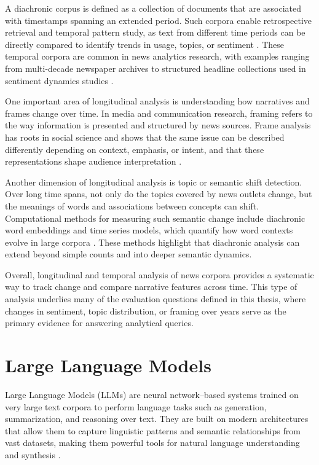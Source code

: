 A diachronic corpus is defined as a collection of documents that are associated with timestamps spanning an extended period. Such corpora enable retrospective retrieval and temporal pattern study, as text from different time periods can be directly compared to identify trends in usage, topics, or sentiment \cite{ir_temporal_ir}. These temporal corpora are common in news analytics research, with examples ranging from multi-decade newspaper archives to structured headline collections used in sentiment dynamics studies \cite{10.1371/journal.pone.0276367}.

One important area of longitudinal analysis is understanding how narratives and frames change over time. In media and communication research, framing refers to the way information is presented and structured by news sources. Frame analysis has roots in social science and shows that the same issue can be described differently depending on context, emphasis, or intent, and that these representations shape audience interpretation \cite{frame_analysis_wikipedia}.

Another dimension of longitudinal analysis is topic or semantic shift detection. Over long time spans, not only do the topics covered by news outlets change, but the meanings of words and associations between concepts can shift. Computational methods for measuring such semantic change include diachronic word embeddings and time series models, which quantify how word contexts evolve in large corpora \cite{dukic2025characterizing}. These methods highlight that diachronic analysis can extend beyond simple counts and into deeper semantic dynamics.

Overall, longitudinal and temporal analysis of news corpora provides a systematic way to track change and compare narrative features across time. This type of analysis underlies many of the evaluation questions defined in this thesis, where changes in sentiment, topic distribution, or framing over years serve as the primary evidence for answering analytical queries.


\section{Large Language Models}

Large Language Models (LLMs) are neural network–based systems trained on very large text corpora to perform language tasks such as generation, summarization, and reasoning over text. They are built on modern architectures that allow them to capture linguistic patterns and semantic relationships from vast datasets, making them powerful tools for natural language understanding and synthesis \cite{large_language_model_wikipedia}.

